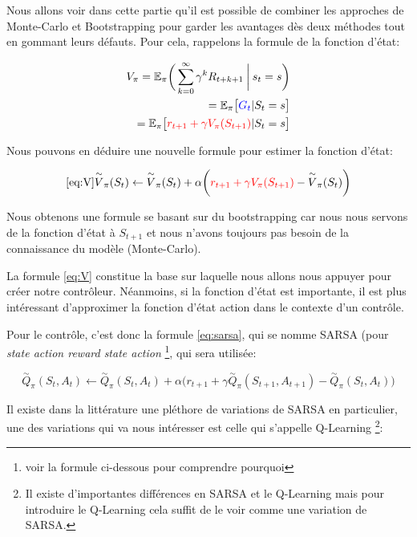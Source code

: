 Nous allons voir dans cette partie qu'il est possible de combiner les approches de Monte-Carlo et Bootstrapping pour garder les avantages dès deux méthodes tout en gommant leurs défauts. Pour cela, rappelons la formule de la fonction d'état: 

\begin{align*}
V_{\pi} = \mathbb{E_\pi}\bigg(\sum_{k=0}^{\infty} \gamma^kR_{t+k+1} \:\bigg\vert\: s_t=s \bigg) \\
= \mathbb{E}_\pi \big[\textcolor{blue}{G_t} \vert S_t = s\big] \\
= \mathbb{E}_\pi \big[\textcolor{red}{r_{t+1} + \gamma V_{\pi}(S_{t+1})} \vert S_t = s\big]
\end{align*}
 
Nous pouvons en déduire une nouvelle formule pour estimer la fonction d'état:
 
\begin{equation}\ref{eq:V}
\overset{\sim}{V}_{\pi}(S_t) \leftarrow \overset{\sim}{V}_{\pi}(S_t) + \alpha \bigg(\textcolor{red}{r_{t+1} + \gamma V_{\pi}(S_{t+1})} - \overset{\sim}{V}_{\pi}(S_t)\bigg)
\end{equation}

Nous obtenons une formule se basant sur du bootstrapping car nous nous servons de la fonction d'état à $S_{t+1}$ et nous n'avons toujours pas besoin de la connaissance du modèle (Monte-Carlo).

La formule \ref{eq:V} constitue la base sur laquelle nous allons nous appuyer pour créer notre contrôleur. Néanmoins, si la fonction d'état est importante, il est plus intéressant d'approximer la fonction d'état action dans le contexte d'un contrôle.

Pour le contrôle, c'est donc la formule \ref{eq:sarsa}, qui se nomme SARSA (pour \emph{state action reward state action} \footnote{voir la formule ci-dessous pour comprendre pourquoi}, qui sera utilisée:

\begin{equation}\label{eq:sarsa}
\overset{\sim}{Q}_{\pi}(S_t, A_t) \leftarrow \overset{\sim}{Q}_{\pi}(S_t, A_t) + \alpha \bigg(r_{t+1} + \gamma \overset{\sim}{Q}_{\pi}(S_{t+1}, A_{t+1}) - \overset{\sim}{Q}_{\pi}(S_t, A_t)\bigg)
\end{equation}

Il existe dans la littérature une pléthore de variations de SARSA en particulier, une des variations qui va nous intéresser est celle qui s'appelle Q-Learning \cite{Watkins92q-learning}\footnote{Il existe d'importantes différences en SARSA et le Q-Learning mais pour introduire le Q-Learning cela suffit de le voir comme une variation de SARSA.}: 

